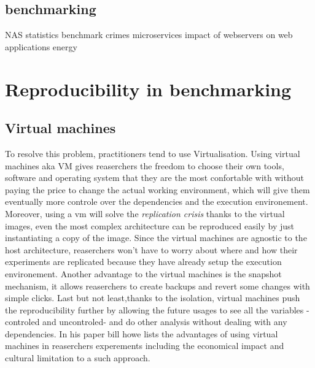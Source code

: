 \subsection{benchmarking}
NAS \cite{bailey_nas_nodate}
statistics \cite{he_statistics-based_2019}
benchmark crimes \cite{van_der_kouwe_benchmarking_2018}
microservices \cite{grambow_benchmarking_2020}
impact of webservers on web applications energy \cite{manotas_investigating_2013}

\section{Reproducibility in benchmarking }




\subsection{Virtual machines}
To resolve this problem, practitioners tend to use Virtualisation. Using virtual machines aka VM gives reaserchers the freedom to choose their own tools, software and operating system that they are the most confortable with without paying the price to change the actual working environment, which will give them eventually more controle over the dependencies and the execution environement. Moreover, using a vm will solve the \emph{replication crisis} thanks to the virtual images, even the most complex architecture can be reproduced easily by just instantiating a copy of the image. Since the virtual machines are agnostic to the host architecture, reaserchers won't have to worry about where and how their experiments are replicated because they have already setup the execution environement. Another advantage to the virtual machines is the snapshot mechanism, it allows reaserchers to create backups and revert some changes with simple clicks. Last but not least,thanks to the isolation, virtual machines push the reproducibility further by allowing the future usages to see all the variables -controled and uncontroled-  and do other analysis without dealing with any dependencies. In his paper \cite{howe_virtual_2012} bill howe lists the advantages of using virtual machines in reaserchers experements including the economical impact and cultural limitation to a such approach.

